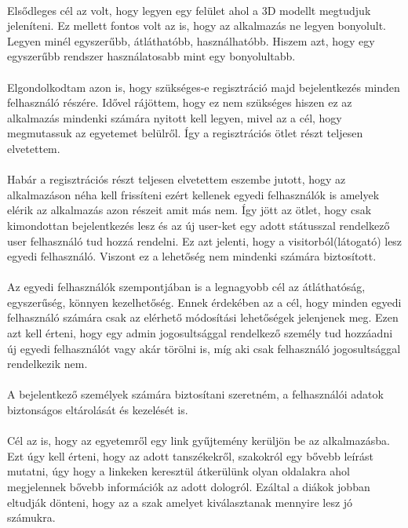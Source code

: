 	\paragraph{}
	Elsődleges cél az volt, hogy legyen egy felület ahol a 3D modellt megtudjuk jeleníteni. Ez mellett fontos volt az is, hogy az alkalmazás ne legyen bonyolult. Legyen minél egyszerűbb, átláthatóbb, használhatóbb. Hiszem azt, hogy egy egyszerűbb rendszer használatosabb mint egy bonyolultabb.
	\paragraph{}
	Elgondolkodtam azon is, hogy szükséges-e regisztráció majd bejelentkezés minden felhasználó részére. Idővel rájöttem, hogy ez nem szükséges hiszen ez az alkalmazás mindenki számára nyitott kell legyen, mivel az a cél, hogy megmutassuk az egyetemet belülről. Így a regisztrációs ötlet részt teljesen elvetettem.
	\paragraph{}
	Habár a regisztrációs részt teljesen elvetettem eszembe jutott, hogy az alkalmazáson néha kell frissíteni ezért kellenek egyedi felhasználók is amelyek elérik az alkalmazás azon részeit amit más nem. Így jött az ötlet, hogy csak kimondottan bejelentkezés lesz és az új user-ket egy adott státusszal rendelkező user felhasználó tud hozzá rendelni. Ez azt jelenti, hogy a visitorból(látogató) lesz egyedi felhasználó. Viszont ez a lehetőség nem mindenki számára biztosított.
	\paragraph{}
	Az egyedi felhasználók szempontjában is a legnagyobb cél az átláthatóság, egyszerűség, könnyen kezelhetőség. Ennek érdekében az a cél, hogy minden egyedi felhasználó számára csak az elérhető módosítási lehetőségek jelenjenek meg. Ezen azt kell érteni, hogy egy admin jogosultsággal rendelkező személy tud hozzáadni új egyedi felhasználót vagy akár törölni is, míg aki csak felhasználó jogosultsággal rendelkezik nem.
	\paragraph{}
	A bejelentkező személyek számára biztosítani szeretném, a felhasználói adatok biztonságos eltárolását és kezelését is.
	\paragraph{}
	Cél az is, hogy az egyetemről egy link gyűjtemény kerüljön be az alkalmazásba. Ezt úgy kell érteni, hogy az adott tanszékekről, szakokról egy bővebb leírást mutatni, úgy hogy a linkeken keresztül átkerülünk olyan oldalakra ahol megjelennek bővebb információk az adott dologról. Ezáltal a diákok jobban eltudják dönteni, hogy az a szak amelyet kiválasztanak mennyire lesz jó számukra.
